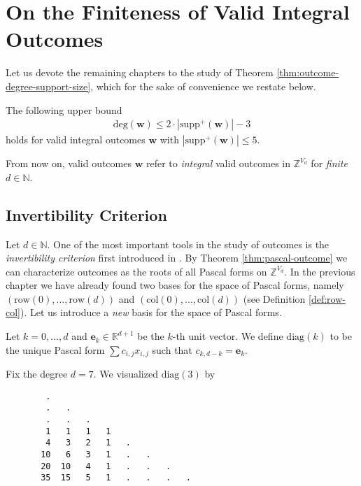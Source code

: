\chapter{On the Finiteness of Valid Integral Outcomes}

Let us devote the remaining chapters to the study of Theorem \ref{thm:outcome-degree-support-size}, which for the sake of convenience we restate below.

\begin{theorem*}
    The following upper bound 
    \begin{align*}
        \mathrm{deg}(\mathbf w) \leq 2 \cdot |\mathrm{supp}^+(\mathbf w)| - 3
    \end{align*}
    holds for valid integral outcomes \( \mathbf w \) with \( |\mathrm{supp}^+(\mathbf w)| \leq 5 \). 
\end{theorem*}

From now on, valid outcomes \( \mathbf{w} \) refer to \emph{integral} valid outcomes in \( \mathbb{Z}^{V_d} \) for \emph{finite} \( d \in \mathbb{N} \). 

\section{Invertibility Criterion}

Let \( d \in \mathbb{N} \).
One of the most important tools in the study of outcomes is the \emph{invertibility criterion} first introduced in \cite{bik2022classifying}. By Theorem \ref{thm:pascal-outcome} we can characterize outcomes as the roots of all Pascal forms on \( \mathbb{Z}^{V_d} \). In the previous chapter we have already found two bases for the space of Pascal forms, namely \((\mathrm{row}(0), \dots, \mathrm{row}(d)) \) and \((\mathrm{col}(0), \dots, \mathrm{col}(d)) \) (see Definition \ref{def:row-col}). Let us introduce a \emph{new} basis for the space of Pascal forms.

\begin{definition}
    Let \( k = 0, \dots, d \) and \( \mathbf e_k \in \mathbb{R}^{d+1} \) be the \( k \)-th unit vector. We define \( \mathrm{diag}(k) \) to be the unique Pascal form \( \sum c_{i,j}x_{i,j} \) such that \( c_{k,d-k} = \mathbf e_k \).
\end{definition}

\begin{example}
    Fix the degree \( d = 7 \). We visualized \( \mathrm{diag}(3) \) by
    \begin{verbatim}
        .
        .   .
        .   .   .
        1   1   1   1
        4   3   2   1   .
       10   6   3   1   .   .
       20  10   4   1   .   .   . 
       35  15   5   1   .   .   .   .
    \end{verbatim}
\end{example}

